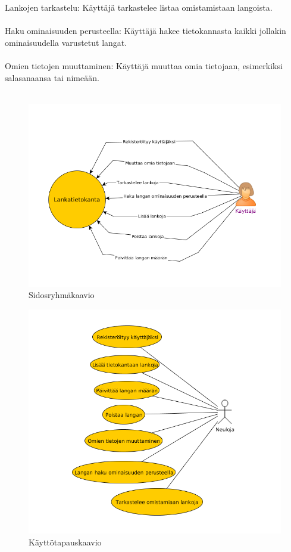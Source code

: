 \documentclass[12pt]{article}
\begin{document}
Lankojen tarkastelu: Käyttäjä tarkastelee listaa omistamistaan langoista.
\\ \ \\
Haku ominaisuuden perusteella: Käyttäjä hakee tietokannasta kaikki jollakin ominaisuudella varustetut langat.
\\ \ \\
Omien tietojen muuttaminen: Käyttäjä muuttaa omia tietojaan, esimerkiksi salasanaansa tai nimeään.
\\ \ \\
\begin{figure}[H]
\includegraphics[scale=0.5]{sidosryhmakaavio.png}
\caption{Sidosryhmäkaavio}
\end{figure}
\begin{figure}[H]
\includegraphics[scale=0.5]{kayttotapaukset.png}
\caption{Käyttötapauskaavio}
\end{figure}
\end{document}
